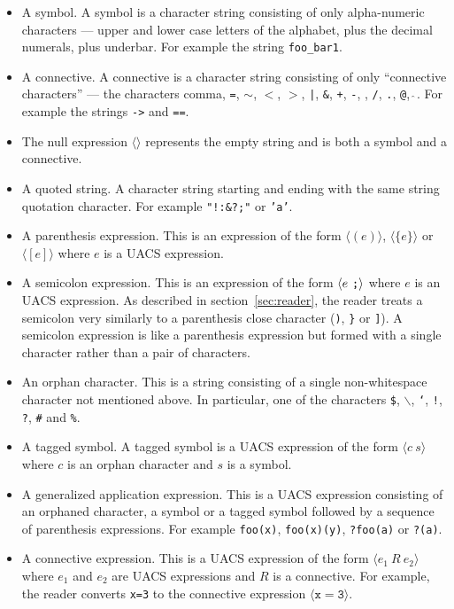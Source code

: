 \documentclass{article}
\newcommand{\mtt}[1]{\mbox{\tt #1}}
\begin{document}
\begin{itemize}
\item A symbol.  A symbol is a character string consisting of only alpha-numeric characters --- upper and lower case letters of the alphabet, plus the decimal numerals, plus underbar.
  For example the string {\tt  foo\_bar1}.
\item A connective.  A connective is a character string consisting of only ``connective characters'' --- the characters comma,
  {\tt =}, {\tt $\sim$}, {\tt $<$}, {\tt $>$}, \mtt{|}, {\tt \&}, {\tt +}, {\tt -}, {\tt *}, {\tt /}, {\tt .}, {\tt @}, \mtt{$\hat{~}$}.
  For example the strings {\tt ->} and {\tt ==}.
\item The null expression $\langle \rangle$ represents the empty string and is both a symbol and a connective.
\item A quoted string.  A character string starting and ending with the same string quotation character.  For example {\tt "!:\&?;"} or {\tt 'a'}.
\item A parenthesis expression.  This is an expression of the form $\langle(e)\rangle$, $\langle\{e\}\rangle$ or $\langle[e]\rangle$ where
  $e$ is a UACS expression.
\item A semicolon expression. This is an expression of the form $\langle e~\mtt{;}\rangle$ where $e$ is an UACS expression.
As described in section~\ref{sec:reader}, the reader treats a semicolon very similarly to a parenthesis close character ({\tt )}, {\tt \}} or {\tt ]}).
  A semicolon expression is like a parenthesis expression but formed with a single character rather than a pair of characters.
\item An orphan character.  This is a string consisting of a single non-whitespace character not mentioned above.  In particular, one of the characters
  {\tt \$}, {\tt $\backslash$}, {\tt `}, {\tt !}, {\tt ?}, {\tt \#} and {\tt \%}.
\item A tagged symbol.  A tagged symbol is a UACS expression of the form $\langle c~s\rangle$ where $c$ is an orphan character and $s$ is a symbol.
\item A generalized application expression.  This is a UACS expression consisting of an orphaned character, a symbol or a tagged symbol followed by a
sequence of parenthesis expressions. For example {\tt foo(x)}, {\tt foo(x)(y)}, {\tt ?foo(a)} or {\tt ?(a)}.
\item A connective expression.  This is a UACS expression of the form $\langle e_1~R~e_2\rangle$ where $e_1$ and $e_2$ are UACS expressions
  and $R$ is a connective.  For example, the reader converts {\tt x=3} to the connective expression $\langle \mathtt{x = 3}\rangle$.
\end{itemize}
\end{document}
